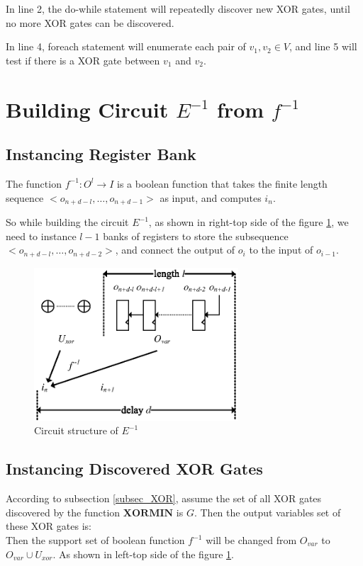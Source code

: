 \documentclass[journal]{IEEEtran}
\begin{document}
In line 2, the do-while statement will repeatedly discover new XOR gates,
until no more XOR gates can be discovered.

In line 4,
foreach statement will enumerate each pair of $v_1,v_2\in V$,
and line 5 will test if there is a XOR gate between $v_1$ and $v_2$.


\section{Building Circuit $E^{-1}$ from $f^{-1}$}\label{sec_build}
\subsection{Instancing Register Bank}
The function $f^{-1}:O^l\to I$ is a boolean function that takes the finite length sequence $<o_{n+d-l},\dots , o_{n+d-1} >$ as input,
and computes $i_n$.

So while building the circuit $E^{-1}$,
as shown in right-top side of the figure \ref{reg_bank},
we need to instance $l-1$ banks of registers to store the subsequence $<o_{n+d-l},\dots , o_{n+d-2} >$,
and connect the output of $o_i$ to the input of $o_{i-1}$.

\begin{figure}[!t]
\centering
\includegraphics[width=3in]{reg_bank}
\caption{Circuit structure of $E^{-1}$}
\label{reg_bank}
\end{figure}

\subsection{Instancing Discovered XOR Gates}\label{subsec_insxor}
According to subsection \ref{subsec_XOR},
assume the set of all XOR gates discovered by the function $\boldsymbol{XORMIN}$ is $G$.
Then the output variables set of these XOR gates is:
\begin{equation}
\end{equation}
Then the support set of boolean function $f^{-1}$ will be changed from $O_{var}$ to $O_{var}\cup U_{xor}$.
As shown in left-top side of the figure \ref{reg_bank}.
\end{document}
